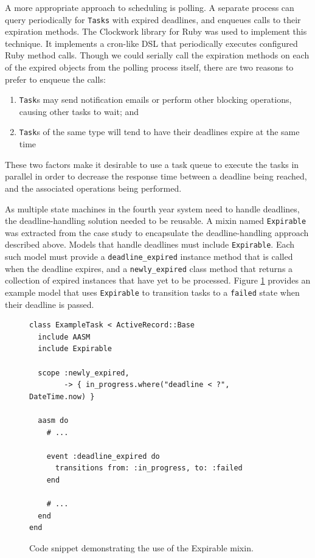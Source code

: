 \documentclass[document.tex]{subfiles}
\begin{document}
A more appropriate approach to scheduling is polling. A separate process can query periodically for \verb!Tasks! with expired deadlines, and enqueues calls to their expiration methods. The Clockwork library for Ruby was used to implement this technique. It implements a cron-like DSL that periodically executes configured Ruby method calls. Though we could serially call the expiration methods on each of the expired objects from the polling process itself, there are two reasons to prefer to enqueue the calls:
\begin{enumerate}
\item \verb!Task!s may send notification emails or perform other blocking operations, causing other tasks to wait; and
\item \verb!Task!s of the same type will tend to have their deadlines expire at the same time
\end{enumerate}
These two factors make it desirable to use a task queue to execute the tasks in parallel in order to decrease the response time between a deadline being reached, and the associated operations being performed.

As multiple state machines in the fourth year system need to handle deadlines, the deadline-handling solution needed to be reusable. A mixin named \verb!Expirable! was extracted from the case study to encapsulate the deadline-handling approach described above. Models that handle deadlines must include \verb!Expirable!. Each such model must provide a \verb!deadline_expired! instance method that is called when the deadline expires, and a \verb!newly_expired! class method that returns a collection of expired instances that have yet to be processed. Figure \ref{fig:deadline-expiration-example} provides an example model that uses \verb!Expirable! to transition tasks to a \verb!failed! state when their deadline is passed.

\begin{figure}[!ht]
  \begin{lstlisting}
class ExampleTask < ActiveRecord::Base
  include AASM
  include Expirable

  scope :newly_expired,
        -> { in_progress.where("deadline < ?", DateTime.now) }

  aasm do
    # ...

    event :deadline_expired do
      transitions from: :in_progress, to: :failed
    end

    # ...
  end
end
  \end{lstlisting}
  \caption{Code snippet demonstrating the use of the Expirable mixin.}
  \label{fig:deadline-expiration-example}
\end{figure}
\end{document}
